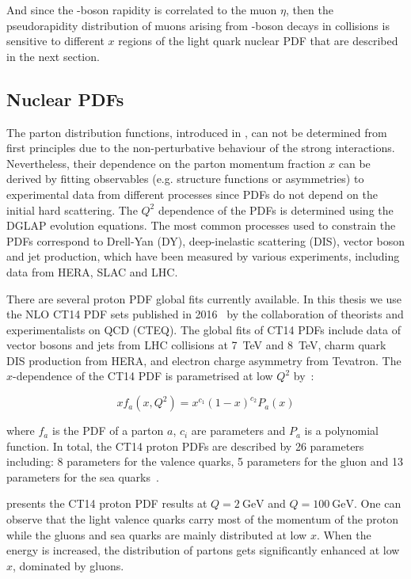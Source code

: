 And since the \Wb-boson rapidity is correlated to the muon $\eta$, then the pseudorapidity distribution of muons arising from \Wb-boson decays in \RunpPb collisions is sensitive to different $x$ regions of the light quark nuclear PDF that are described in the next section.


\subsection{Nuclear PDFs}\label{sec:WBoson_Introduction_nPDFs}

The parton distribution functions, introduced in , can not be determined from first principles due to the non-perturbative behaviour of the strong interactions. Nevertheless, their dependence on the parton momentum fraction $x$ can be derived by fitting observables (e.g. structure functions or asymmetries) to experimental data from different processes since PDFs do not depend on the initial hard scattering. The $Q^{2}$ dependence of the PDFs is determined using the DGLAP evolution equations. The most common processes used to constrain the PDFs correspond to Drell-Yan (DY), deep-inelastic scattering (DIS), vector boson and jet production, which have been measured by various experiments, including data from HERA, SLAC and LHC.

There are several proton PDF global fits currently available. In this thesis we use the NLO CT14 PDF sets published in 2016~\cite{CT14} by the collaboration of theorists and experimentalists on QCD (CTEQ). The global fits of CT14 PDFs include data of vector bosons and jets from LHC \Runpp collisions at \SI{7}{\TeV} and \SI{8}{\TeV}, charm quark DIS production from HERA, and electron charge asymmetry from Tevatron. The $x$-dependence of the CT14 PDF is parametrised at low $Q^{2}$ by~\cite{CT14}:

\begin{equation}
 xf_{a}\left(x, Q^{2}\right) = x^{c_{1}}\left(1-x\right)^{c_{2}}{P_{a}\left(x\right)}
\end{equation}

where $f_{a}$ is the PDF of a parton $a$, $c_{i}$ are parameters and $P_{a}$ is a polynomial function. In total, the CT14 proton PDFs are described by 26 parameters including: 8 parameters for the valence quarks, 5 parameters for the gluon and 13 parameters for the sea quarks~\cite{CT14}.

 presents the CT14 proton PDF results at $Q = \SI{2}{\GeV}$ and $Q = \SI{100}{\GeV}$. One can observe that the light valence quarks carry most of the momentum of the proton while the gluons and sea quarks are mainly distributed at low $x$. When the energy is increased, the distribution of partons gets significantly enhanced at low $x$, dominated by gluons.

